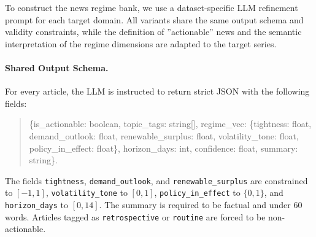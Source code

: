 \documentclass{article}
\begin{document}
To construct the news regime bank, we use a dataset-specific LLM refinement prompt for each target domain. All variants share the same output schema and validity constraints, while the definition of ''actionable'' news and the semantic interpretation of the regime dimensions are adapted to the target series.

\paragraph{Shared Output Schema.}
For every article, the LLM is instructed to return strict JSON with the following fields:
\begin{quote}
\small
\ttfamily
\{is\_actionable: boolean, topic\_tags: string[], regime\_vec: \{tightness: float, demand\_outlook: float, renewable\_surplus: float, volatility\_tone: float, policy\_in\_effect: float\}, horizon\_days: int, confidence: float, summary: string\}.
\end{quote}
The fields \texttt{tightness}, \texttt{demand\_outlook}, and \texttt{renewable\_surplus} are constrained to $[-1,1]$, \texttt{volatility\_tone} to $[0,1]$, \texttt{policy\_in\_effect} to $\{0,1\}$, and \texttt{horizon\_days} to $[0,14]$. The summary is required to be factual and under 60 words. Articles tagged as \texttt{retrospective} or \texttt{routine} are forced to be non-actionable.
\end{document}
